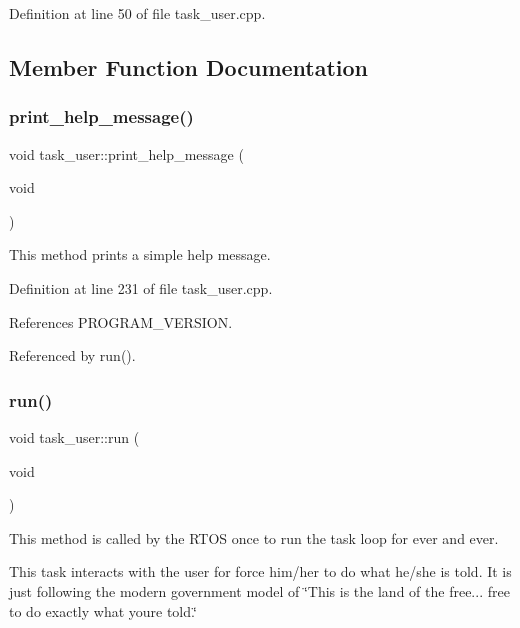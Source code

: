 Definition at line 50 of file task\+\_\+user.\+cpp.



\subsection{Member Function Documentation}
\mbox{\label{classtask__user_a75475060f83bae1e44bcc8a5c34015c7}} 
\subsubsection{\texorpdfstring{print\+\_\+help\+\_\+message()}{print\_help\_message()}}
{\footnotesize\ttfamily void task\+\_\+user\+::print\+\_\+help\+\_\+message (\begin{DoxyParamCaption}\item[{void}]{ }\end{DoxyParamCaption})\hspace{0.3cm}{\ttfamily [protected]}}

This method prints a simple help message. 

Definition at line 231 of file task\+\_\+user.\+cpp.



References P\+R\+O\+G\+R\+A\+M\+\_\+\+V\+E\+R\+S\+I\+ON.



Referenced by run().

\mbox{\label{classtask__user_adca6429d57be25e8d411414fc8ad75af}} 
\subsubsection{\texorpdfstring{run()}{run()}}
{\footnotesize\ttfamily void task\+\_\+user\+::run (\begin{DoxyParamCaption}\item[{void}]{ }\end{DoxyParamCaption})}

This method is called by the R\+T\+OS once to run the task loop for ever and ever.

This task interacts with the user for force him/her to do what he/she is told. It is just following the modern government model of \char`\"{}\+This is the land of the free...
free to do exactly what you\textquotesingle{}re told.\char`\"{} 

